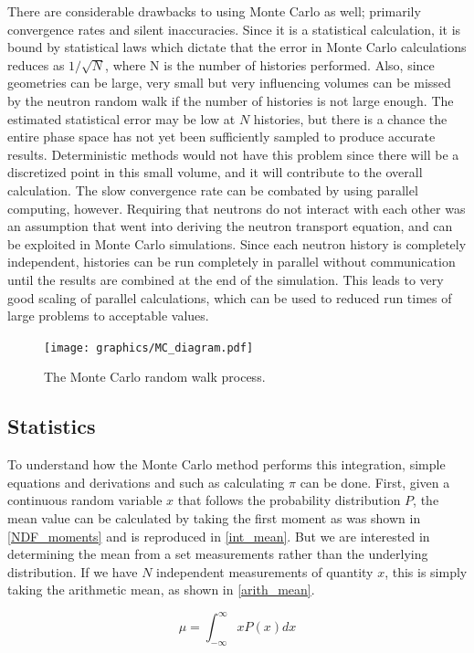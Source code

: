 There are considerable drawbacks to using Monte Carlo as well; primarily convergence rates and silent inaccuracies.  Since it is a statistical calculation, it is bound by statistical laws which dictate that the error in Monte Carlo calculations reduces as $1/\sqrt{N}$, where N is the number of histories performed.  Also, since geometries can be large, very small but very influencing volumes can be missed by the neutron random walk if the number of histories is not large enough.  The estimated statistical error may be low at $N$ histories, but there is a chance the entire phase space has not yet been sufficiently sampled to produce accurate results.  Deterministic methods would not have this problem since there will be a discretized point in this small volume, and it will contribute to the overall calculation.  The slow convergence rate can be combated by using parallel computing, however.  Requiring that neutrons do not interact with each other was an assumption that went into deriving the neutron transport equation, and can be exploited in Monte Carlo simulations.  Since each neutron history is completely independent, histories can be run completely in parallel without communication until the results are combined at the end of the simulation.  This leads to very good scaling of parallel calculations, which can be used to reduced run times of large problems to acceptable values.

\begin{figure}[h!] 
  \centering
    \texttt{[image: graphics/MC\_diagram.pdf]}
     \caption{The Monte Carlo random walk process. \label{random_walk}}
\end{figure}

\subsection{Statistics}
To understand how the Monte Carlo method performs this integration, simple equations and derivations and such as calculating $\pi$ can be done.   First, given a continuous random variable $x$ that follows the probability distribution $P$, the mean value can be calculated by taking the first moment as was shown in \eqref{NDF_moments} and is reproduced in \eqref{int_mean}.  But we are interested in determining the mean from a set measurements rather than the underlying distribution.  If we have $N$ independent measurements of quantity $x$, this is simply taking the arithmetic mean, as shown in \eqref{arith_mean}.

\begin{equation}
\label{int_mean}
\mu = \int_{-\infty}^{\infty} x P(x) dx
\end{equation}


